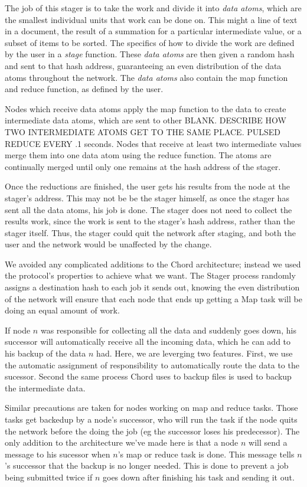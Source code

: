 \documentclass[conference, compsocconf, letterpaper]{IEEEtran}
\begin{document}
The job of this stager is to take the work and divide it into \emph{data atoms}, which are the smallest individual units that work can be done on.  This might a line of text in a document, the result of a summation for a particular intermediate value, or a subset of items to be sorted.  The specifics of how to divide the work are defined by the user in a \emph{stage} function.  These \emph{data atoms} are then given a random hash and sent to that hash address, guaranteeing an even distribution of the data atoms throughout the network.  The \emph{data atoms} also contain the map function and reduce function, as defined by the user.

Nodes which receive data atoms apply the map function to the data to create intermediate data atoms, which are sent to other BLANK.  DESCRIBE HOW TWO INTERMEDIATE ATOMS GET TO THE SAME PLACE. PULSED REDUCE EVERY .1 seconds. Nodes that receive at least two intermediate values merge them into one data atom using the reduce function.   The atoms are continually merged until only one remains at the hash address of the stager. 

Once the reductions are finished, the user gets his results from the node at the stager's address.  This may not be be the stager himself, as once the stager has sent all the data atoms, his job is done.  The stager does not need to collect the results work, since the work is sent to the stager's hash address, rather than the stager itself.  Thus, the stager could quit the network after staging, and both the user and the network would be unaffected by the change.


We avoided any complicated additions to the Chord architecture; instead we used the protocol's properties to achieve what we want.  The Stager process randomly assigns a destination hash to each job it sends out, knowing the even distribution of the network will ensure that each node that ends up getting a Map task will be doing an equal amount of work.  

If node $n$ was responsible for collecting all the data and suddenly goes down, his successor will automatically receive all the incoming data, which he can add to his backup of the data $n$ had.  Here, we are leverging two features. First,  we use the automatic assignment of responsibility to automatically route the data to the sucessor. Second the same process Chord uses to backup files is used to backup the intermediate data. 

Similar precautions are taken for nodes working on map and reduce tasks.  Those tasks get backedup  by a node's successor, who will run the task if the node quits the network before the doing the job (eg the successor loses his predecessor).   The only addition to the architecture we've made here is that a node $n$ will send a message to his sucessor when  $n$'s map or reduce task is done.  This message tells $n$'s successor that the backup is no longer needed.  This is done to prevent a job being submitted twice if $n$ goes down after finishing his task and sending it out.
\end{document}
